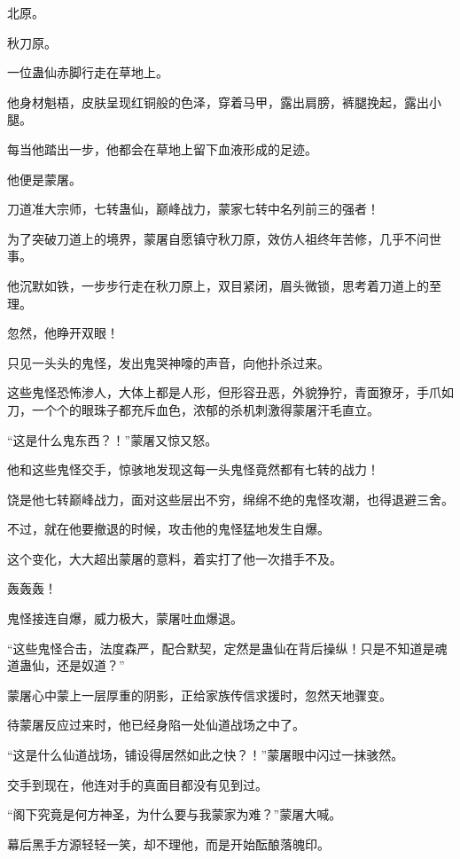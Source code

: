 
\begin{this_body}

北原。

秋刀原。

一位蛊仙赤脚行走在草地上。

他身材魁梧，皮肤呈现红铜般的色泽，穿着马甲，露出肩膀，裤腿挽起，露出小腿。

每当他踏出一步，他都会在草地上留下血液形成的足迹。

他便是蒙屠。

刀道准大宗师，七转蛊仙，巅峰战力，蒙家七转中名列前三的强者！

为了突破刀道上的境界，蒙屠自愿镇守秋刀原，效仿人祖终年苦修，几乎不问世事。

他沉默如铁，一步步行走在秋刀原上，双目紧闭，眉头微锁，思考着刀道上的至理。

忽然，他睁开双眼！

只见一头头的鬼怪，发出鬼哭神嚎的声音，向他扑杀过来。

这些鬼怪恐怖渗人，大体上都是人形，但形容丑恶，外貌狰狞，青面獠牙，手爪如刀，一个个的眼珠子都充斥血色，浓郁的杀机刺激得蒙屠汗毛直立。

“这是什么鬼东西？！”蒙屠又惊又怒。

他和这些鬼怪交手，惊骇地发现这每一头鬼怪竟然都有七转的战力！

饶是他七转巅峰战力，面对这些层出不穷，绵绵不绝的鬼怪攻潮，也得退避三舍。

不过，就在他要撤退的时候，攻击他的鬼怪猛地发生自爆。

这个变化，大大超出蒙屠的意料，着实打了他一次措手不及。

轰轰轰！

鬼怪接连自爆，威力极大，蒙屠吐血爆退。

“这些鬼怪合击，法度森严，配合默契，定然是蛊仙在背后操纵！只是不知道是魂道蛊仙，还是奴道？”

蒙屠心中蒙上一层厚重的阴影，正给家族传信求援时，忽然天地骤变。

待蒙屠反应过来时，他已经身陷一处仙道战场之中了。

“这是什么仙道战场，铺设得居然如此之快？！”蒙屠眼中闪过一抹骇然。

交手到现在，他连对手的真面目都没有见到过。

“阁下究竟是何方神圣，为什么要与我蒙家为难？”蒙屠大喊。

幕后黑手方源轻轻一笑，却不理他，而是开始酝酿落魄印。


\end{this_body}
